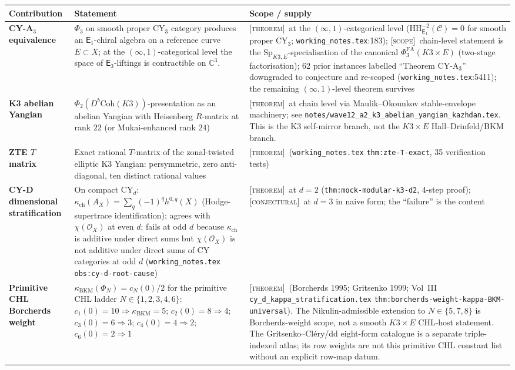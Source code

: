 \documentclass[11pt]{article}
\theoremstyle{definition}
\theoremstyle{remark}
\providecommand{\C}{\mathbb{C}}
\providecommand{\cC}{\mathcal{C}}
\providecommand{\cO}{\mathcal{O}}
\providecommand{\Coh}{\mathrm{Coh}}
\providecommand{\Sp}{\mathrm{Sp}}
\providecommand{\Phifa}{\Phi^{\mathrm{FA}}}
\providecommand{\HH}{\mathrm{HH}}
\providecommand{\Eone}{\mathsf{E}_1}
\providecommand{\Ethree}{\mathsf{E}_3}
\providecommand{\kch}{\kappa_{\mathrm{ch}}}
\providecommand{\kBKM}{\kappa_{\mathrm{BKM}}}
\providecommand{\ClaimStatusTheorem}{\textsc{[theorem]}}
\providecommand{\ClaimStatusConjectured}{\textsc{[conjectural]}}
\providecommand{\ClaimStatusScope}{\textsc{[scope]}}
\begin{document}
\renewcommand{\arraystretch}{1.25}
\begin{longtable}{@{}p{3.5cm}p{6.0cm}p{5.5cm}@{}}
\toprule
\textbf{Contribution} & \textbf{Statement} & \textbf{Scope / supply} \\
\midrule
\endfirsthead

\textbf{CY-A$_3$ equivalence}
& $\Phi_3$ on smooth proper CY$_3$ category produces an $\Eone$-chiral
algebra on a reference curve $E\subset X$; at the
$(\infty,1)$-categorical level the space of $\Ethree$-liftings is
contractible on $\C^3$.
& \ClaimStatusTheorem\ at the $(\infty,1)$-categorical level
($\HH^{-2}_{\Eone}(\cC) = 0$ for smooth proper CY$_3$;
\texttt{working\_notes.tex}:183);
\ClaimStatusScope\ chain-level statement is the
$\Sp_{K3,E}$-specialisation of the canonical
$\Phifa_3(K3\times E)$ (two-stage factorisation); 62 prior instances
labelled ``Theorem CY-A$_3$'' downgraded to conjecture and
re-scoped (\texttt{working\_notes.tex}:5411); the remaining
$(\infty,1)$-level theorem survives
\\[0.3ex]

\textbf{K3 abelian Yangian}
& $\Phi_2(D^b\Coh(K3))$-presentation as an abelian Yangian with
Heisenberg $R$-matrix at rank $22$ (or Mukai-enhanced rank $24$)
& \ClaimStatusTheorem\ at chain level via Maulik--Okounkov
stable-envelope machinery; see
\texttt{notes/wave12\_a2\_k3\_abelian\_yangian\_kazhdan.tex}.
This is the K3 self-mirror branch, not the $K3\times E$
Hall--Drinfeld/BKM branch.
\\[0.3ex]

\textbf{ZTE $T$ matrix}
& Exact rational $T$-matrix of the zonal-twisted elliptic K3 Yangian:
persymmetric, zero anti-diagonal, ten distinct rational values
& \ClaimStatusTheorem\ (\texttt{working\_notes.tex}
\texttt{thm:zte-T-exact}, 35 verification tests)
\\[0.3ex]

\textbf{CY-D dimensional stratification}
& On compact CY$_d$: $\kch(A_X) = \sum_q(-1)^q h^{0,q}(X)$
(Hodge-supertrace identification); agrees with $\chi(\cO_X)$ at
even $d$; fails at odd $d$ because $\kch$ is additive under direct
sums but $\chi(\cO_X)$ is not additive under direct sums of CY
categories at odd $d$ (\texttt{working\_notes.tex}
\texttt{obs:cy-d-root-cause})
& \ClaimStatusTheorem\ at $d=2$ (\texttt{thm:mock-modular-k3-d2},
4-step proof); \ClaimStatusConjectured\ at $d=3$ in naive form;
the ``failure'' is the content
\\[0.3ex]

\textbf{Primitive CHL Borcherds weight}
& $\kBKM(\Phi_N) = c_N(0)/2$ for the primitive CHL ladder
$N\in\{1,2,3,4,6\}$:
$c_1(0) = 10 \Rightarrow \kBKM = 5$; $c_2(0) = 8\Rightarrow 4$;
$c_3(0) = 6\Rightarrow 3$; $c_4(0) = 4\Rightarrow 2$;
$c_6(0) = 2\Rightarrow 1$
& \ClaimStatusTheorem\ (Borcherds 1995; Gritsenko 1999; Vol~III
\texttt{cy\_d\_kappa\_stratification.tex}
\texttt{thm:borcherds-weight-kappa-BKM-universal}). The
Nikulin-admissible extension to $N\in\{5,7,8\}$ is Borcherds-weight
scope, not a smooth $K3\times E$ CHL-host statement. The
Gritsenko--Cl\'ery/dd eight-form catalogue is a separate
triple-indexed atlas; its row weights are not this primitive CHL
constant list without an explicit row-map datum.
\\[0.3ex]


\end{longtable}
\end{document}
